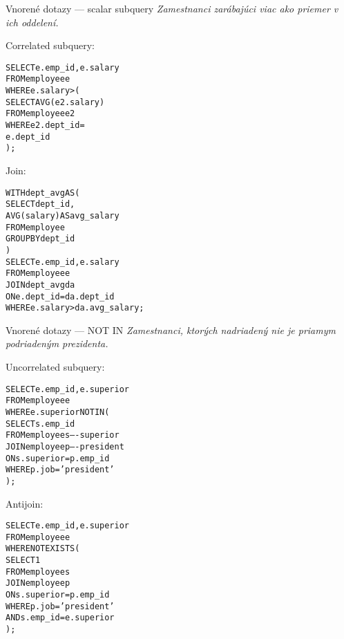 \documentclass[12pt]{beamer}
\def\blue#1{\textcolor{Cerulean}{#1}}
\begin{document}
\begin{frame}[fragile]{Vnorené dotazy --- scalar subquery}
\footnotesize
\emph{Zamestnanci zarábajúci viac ako priemer v ich oddelení.}\\[7mm]
\begin{minipage}{.4\pdfpagewidth}
Correlated subquery:
\footnotesize
\begin{alltt}
SELECT e.emp_id, e.salary
FROM employee e
WHERE \blue{e.salary >} (
  SELECT AVG(e2.salary)
  FROM employee e2
  WHERE e2.dept_id =
    e.dept_id
);



\end{alltt}
\end{minipage}
\hfill\vline\hfill
\begin{minipage}{.4\pdfpagewidth}
Join:
\footnotesize
\begin{alltt}
WITH dept_avg AS (
  SELECT dept_id,
    AVG(salary) AS avg_salary
  FROM employee
  GROUP BY dept_id
)
SELECT e.emp_id, e.salary
FROM employee e
  JOIN dept_avg da
    ON e.dept_id = da.dept_id
WHERE \blue{e.salary >} da.avg_salary;
\end{alltt}
\end{minipage}
\end{frame}

\begin{frame}[fragile]{Vnorené dotazy --- NOT IN}
\footnotesize
\emph{Zamestnanci, ktorých nadriadený nie je priamym podriadeným prezidenta.}\\[7mm]
\begin{minipage}{.4\pdfpagewidth}
\alert{Un}correlated subquery:
\footnotesize
\begin{alltt}
SELECT e.emp_id, e.superior
FROM employee e
WHERE \blue{e.superior NOT IN} (
  SELECT \blue{s.emp_id}
  FROM employee s ----superior
  JOIN employee p ----president
    ON s.superior = p.emp_id
  WHERE p.job = 'president'
);

\end{alltt}
\end{minipage}
\hfill\vline\hfill
\begin{minipage}{.4\pdfpagewidth}
Antijoin:
\footnotesize
\begin{alltt}
SELECT e.emp_id, e.superior
FROM employee e
WHERE \blue{NOT EXISTS} (
  SELECT 1
  FROM employee s
  JOIN employee p
    ON s.superior = p.emp_id
  WHERE p.job = 'president'
    \blue{AND s.emp_id = e.superior}
);
\end{alltt}
\end{minipage}
\end{frame}
\end{document}
